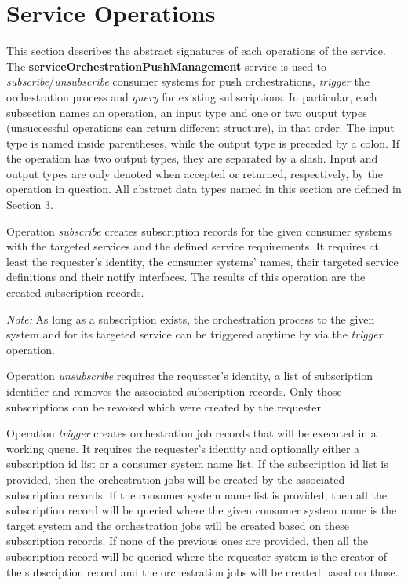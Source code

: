 \documentclass[a4paper]{arrowhead}
\begin{document}
\newpage

\section{Service Operations}
\label{sec:functions}

This section describes the abstract signatures of each operations of the service. The \textbf{serviceOrchestrationPushManagement} service is used to \textit{subscribe}/\textit{unsubscribe} consumer systems for push orchestrations, \textit{trigger} the orchestration process and \textit{query} for existing subscriptions. 
In particular, each subsection names an operation, an input type and one or two output types (unsuccessful operations can return different structure), in that order.
The input type is named inside parentheses, while the output type is preceded by a colon. If the operation has two output types, they are separated by a slash.
Input and output types are only denoted when accepted or returned, respectively, by the operation in question. All abstract data types named in this section are defined in Section 3.

{}

Operation \textit{subscribe} creates subscription records for the given consumer systems with the targeted services and the defined service requirements. It requires at least the requester's identity, the consumer systems' names, their targeted service definitions and their notify interfaces. The results of this operation are the created subscription records.

\textit{Note:} As long as a subscription exists, the orchestration process to the given system and for its targeted service can be triggered anytime by via the \textit{trigger} operation.


Operation \textit{unsubscribe} requires the requester's identity, a list of subscription identifier and removes the associated subscription records. Only those subscriptions can be revoked which were created by the requester.


Operation \textit{trigger} creates orchestration job records that will be executed in a working queue. It requires the requester's identity and optionally either a subscription id list or a consumer system name list. If the subscription id list is provided, then the orchestration jobs will be created by the associated subscription records. If the consumer system name list is provided, then all the subscription record will be queried where the given consumer system name is the target system and the orchestration jobs will be created based on these subscription records. If none of the previous ones are provided, then all the subscription record will be queried where the requester system is the creator of the subscription record and the orchestration jobs will be created based on those.
\end{document}
